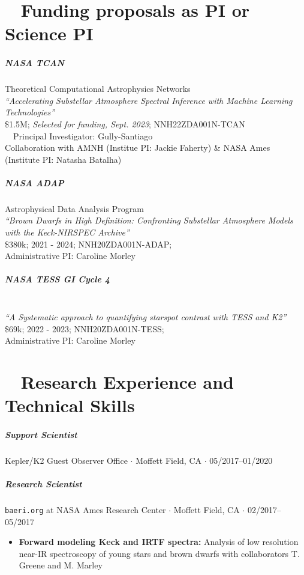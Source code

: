 \documentclass[10pt,letterpaper]{article}
\begin{document}
\section*{\faMoneyCheck* ~ Funding proposals as PI or Science PI }


\subparagraph{NASA TCAN}\mbox{} Theoretical Computational Astrophysics Networks\\
\emph{``Accelerating Substellar Atmosphere Spectral Inference with Machine Learning Technologies''} \\
\$1.5M; \emph{Selected for funding, Sept. 2023}; NNH22ZDA001N-TCAN\\
\faRocket ~~Principal Investigator: Gully-Santiago\\
Collaboration with AMNH (Institue PI: Jackie Faherty) \& NASA Ames (Institute PI: Natasha Batalha) \\

\subparagraph{NASA ADAP}\mbox{} Astrophysical Data Analysis Program\\
\emph{``Brown Dwarfs in High Definition: Confronting Substellar Atmosphere Models with the Keck-NIRSPEC Archive''} \\
\$380k; 2021 - 2024; NNH20ZDA001N-ADAP; \\
Administrative PI: Caroline Morley


\subparagraph{NASA TESS GI Cycle 4}\mbox{}\\
\emph{``A Systematic approach to quantifying starspot contrast with TESS and K2''}\\
\$69k; 2022 - 2023; NNH20ZDA001N-TESS; \\
Administrative PI: Caroline Morley


\section*{\faWrench ~ Research Experience and Technical Skills}

\subparagraph{Support Scientist}
Kepler/K2 Guest Observer Office $\cdot$ Moffett Field, CA $\cdot$ 05/2017--01/2020

\subparagraph{Research Scientist}
\texttt{baeri.org} at NASA Ames Research Center $\cdot$ Moffett Field, CA $\cdot$ 02/2017--05/2017
\begin{itemize}
    \item  \textbf{Forward modeling Keck and IRTF spectra:} Analysis of low resolution near-IR spectroscopy of young stars and brown dwarfs with collaborators T. Greene and M. Marley
\end{itemize}
\end{document}
